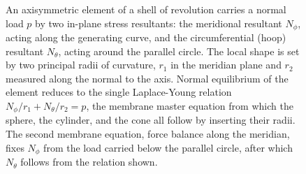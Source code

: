 \begin{figure}[htbp]
\caption[Membrane resultants on a shell of revolution]{An axisymmetric
element of a shell of revolution carries a normal load $p$ by two in-plane
stress resultants: the meridional resultant $N_\phi$, acting along the
generating curve, and the circumferential (hoop) resultant $N_\theta$,
acting around the parallel circle. The local shape is set by two principal
radii of curvature, $r_1$ in the meridian plane and $r_2$ measured along the
normal to the axis. Normal equilibrium of the element reduces to the single
Laplace-Young relation $N_\phi/r_1 + N_\theta/r_2 = p$, the membrane
master equation from which the sphere, the cylinder, and the cone all
follow by inserting their radii. The second membrane equation, force
balance along the meridian, fixes $N_\phi$ from the load carried below the
parallel circle, after which $N_\theta$ follows from the relation shown.}
\label{fig:vol03ch09:shell-revolution-element}
\end{figure}
